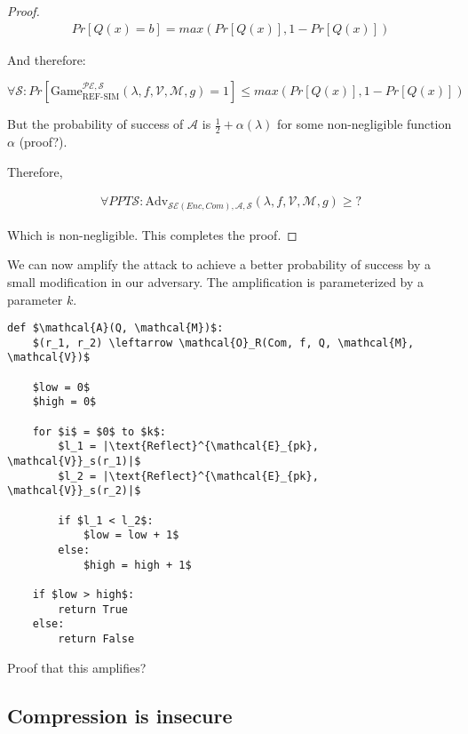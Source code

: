 \documentclass[a4paper, 11 pt, conference]{article}
\begin{document}
\begin{proof}
\begin{align*}
    Pr[Q(x) = b] = max(Pr[Q(x)], 1 - Pr[Q(x)])
\end{align*}

And therefore:

\begin{equation}
    \forall \mathcal{S}:
    Pr[\text{Game}_{\text{REF-SIM}}^{\mathcal{PE},\mathcal{S}}(\lambda, f, \mathcal{V}, \mathcal{M}, g) = 1] \leq max(Pr[Q(x)], 1 - Pr[Q(x)])
\end{equation}

But the probability of success of $\mathcal{A}$ is $\frac{1}{2} +
\alpha(\lambda)$ for some non-negligible function $\alpha$ (proof?).

Therefore,

\begin{equation}
\begin{split}
    \forall PPT \mathcal{S}:
    \text{Adv}_{\mathcal{SE}(Enc, Com), \mathcal{A}, \mathcal{S}}(\lambda, f, \mathcal{V}, \mathcal{M}, g) \geq ?
\end{split}
\end{equation}

Which is non-negligible. This completes the proof.

\end{proof}

We can now amplify the attack to achieve a better probability of success by a
small modification in our adversary. The amplification is parameterized by a
parameter $k$.

\begin{lstlisting}[texcl,mathescape]
def $\mathcal{A}(Q, \mathcal{M})$:
    $(r_1, r_2) \leftarrow \mathcal{O}_R(Com, f, Q, \mathcal{M}, \mathcal{V})$

    $low = 0$
    $high = 0$

    for $i$ = $0$ to $k$:
        $l_1 = |\text{Reflect}^{\mathcal{E}_{pk}, \mathcal{V}}_s(r_1)|$
        $l_2 = |\text{Reflect}^{\mathcal{E}_{pk}, \mathcal{V}}_s(r_2)|$

        if $l_1 < l_2$:
            $low = low + 1$
        else:
            $high = high + 1$

    if $low > high$:
        return True
    else:
        return False
\end{lstlisting}

Proof that this amplifies?

\subsection{Compression is insecure}\label{subsec:cominsecure}
\end{document}
